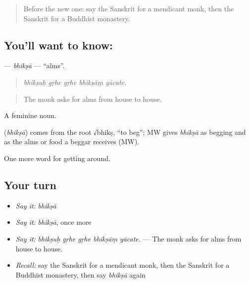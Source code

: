 \label{lesson:SA-C401-bhiksa}



\begin{quote}
Before the new one: say the Sanskrit for a mendicant monk, then the Sanskrit for a Buddhist monastery.
\end{quote}

\subsection*{You'll want to know: }
\textbf{} — \emph{bhikṣā} — \textquotedblleft{}alms\textquotedblright{}.

\begin{quote}
    
\end{quote}

\begin{quote}
\emph{bhikṣuḥ gṛhe gṛhe bhikṣāṃ yācate.}
\end{quote}

\begin{quote}
The monk asks for alms from house to house.
\end{quote}

A feminine noun.

\begin{cousinweb}
\textbf{} (\emph{bhikṣā}) comes from the root √bhikṣ, \textquotedblleft{}to beg\textquotedblright{}; MW gives \emph{bhikṣā} as begging and as the alms or food a beggar receives (MW).
\end{cousinweb}

\begin{grammarlens}[title={What you've built}]
One more word for getting around.
\end{grammarlens}

\subsection*{Your turn}
\begin{itemize}
\raggedright
  \item \emph{Say it:} \emph{bhikṣā}
  \item \emph{Say it:} \emph{bhikṣā}, once more
  \item \emph{Say it:} \emph{bhikṣuḥ gṛhe gṛhe bhikṣāṃ yācate.} — The monk asks for alms from house to house.
  \item \emph{Recall:} say the Sanskrit for a mendicant monk, then the Sanskrit for a Buddhist monastery, then say \emph{bhikṣā} again
\end{itemize}

